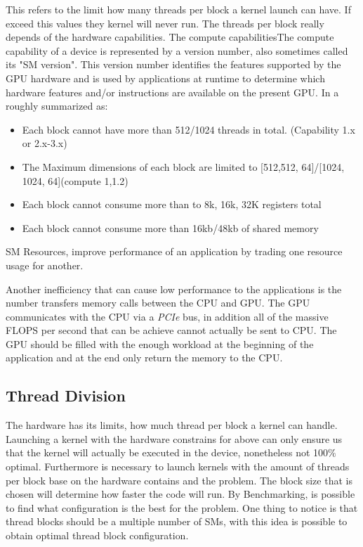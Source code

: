 This refers to the limit how many threads per block a kernel launch can have. If exceed this values they kernel will never run. The threads per block really depends of the hardware capabilities.  The compute capabilitiesThe compute capability of a device is represented by a version number, also sometimes called its "SM version". This version number identifies the features supported by the GPU hardware and is used by applications at runtime to determine which hardware features and/or instructions are available on the present GPU.\cite{tool} In a roughly summarized as:

\begin{itemize}
\item Each block cannot have more than 512/1024 threads in total. (Capability 1.x or 2.x-3.x)
\item The Maximum dimensions of each block are limited to [512,512, 64]/[1024, 1024, 64](compute 1,1.2)
\item Each block cannot consume more than to 8k, 16k, 32K registers total
\item Each block cannot consume more than 16kb/48kb of shared memory
\end{itemize}

SM Resources, improve performance of an application by trading one resource usage for another.  \cite{practices}

Another inefficiency that can cause low performance to the applications is the number transfers memory calls between the CPU and GPU. The GPU communicates with the CPU via a \textit{PCIe} bus, in addition all of the massive FLOPS per second that can be achieve cannot actually be sent to CPU. The GPU should be filled with the enough workload at the beginning of the application and at the end only return the memory to the CPU.

\subsection{Thread Division}

The hardware has its limits, how much thread per block a kernel can handle. Launching a kernel with the hardware constrains for above can only ensure us that the kernel will actually be executed in the device, nonetheless not 100$\%$ optimal. Furthermore is necessary to launch kernels with the amount of threads per block base on the hardware contains and the problem. The block size that is chosen will determine how faster the code will run. By Benchmarking, is possible to find what configuration is the best for the problem. One thing to notice is that thread blocks should be a multiple number of SMs, with this idea is possible to obtain optimal thread block configuration.

